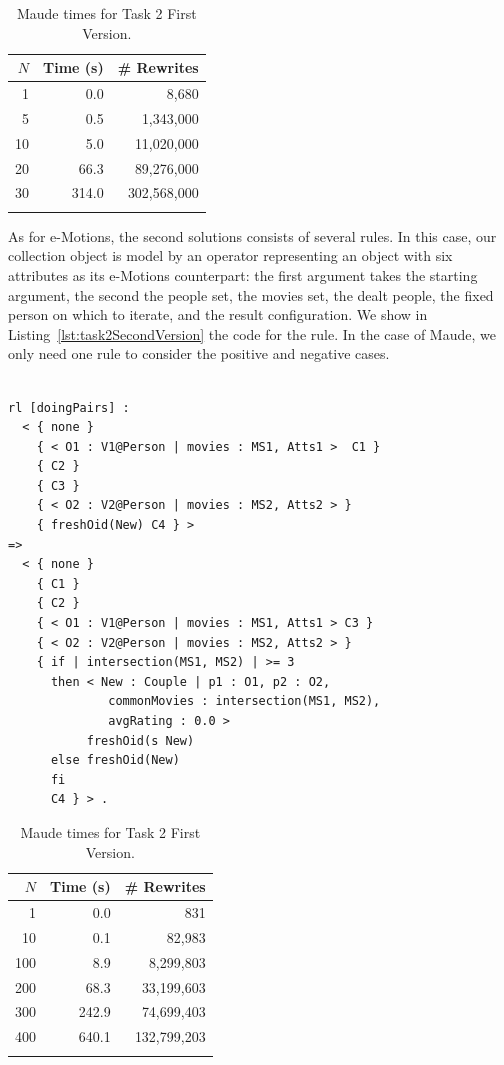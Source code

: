 \begin{table}[htb]
\renewcommand{\tabcolsep}{6pt}
\renewcommand{\arraystretch}{1.2}
    \centering
	\begin{tabular}{r r r}
	$N$ & Time (s) & \# Rewrites \\
	\hline
	1 & 0.0 & 8,680 \\
	5 & 0.5 & 1,343,000 \\
	10 & 5.0 & 11,020,000 \\
	20 & 66.3 & 89,276,000 \\
	30 & 314.0 & 302,568,000 \\
	\hline \\
	\end{tabular}
	\caption{Maude times for Task 2 First Version.}\label{table:maudetask21}
\end{table}

As for e-Motions, the second solutions consists of several rules. In this case, our collection object is model by an operator \code{\{\_\}\{\_\}\{\_\}\{\_\}\{\_\}\{\_\}} representing an object with six attributes as its e-Motions counterpart: the first argument takes the starting argument, the second the people set, the movies set, the dealt people, the fixed person on which to iterate, and the result configuration. We show in Listing~\ref{lst:task2SecondVersion} the code for the  rule. In the case of Maude, we only need one rule to consider the positive and negative cases. 

\begin{lstlisting}[caption=\code{doingCouples} Maude rule., label=lst:task2SecondVersion]

rl [doingPairs] :
  < { none }
    { < O1 : V1@Person | movies : MS1, Atts1 >  C1 }
    { C2 }
    { C3 }
    { < O2 : V2@Person | movies : MS2, Atts2 > }
    { freshOid(New) C4 } >
=> 
  < { none }
    { C1 }
    { C2 }
    { < O1 : V1@Person | movies : MS1, Atts1 > C3 }
    { < O2 : V2@Person | movies : MS2, Atts2 > }
    { if | intersection(MS1, MS2) | >= 3 
      then < New : Couple | p1 : O1, p2 : O2, 
              commonMovies : intersection(MS1, MS2), 
              avgRating : 0.0 >
           freshOid(s New)
      else freshOid(New)
      fi 
      C4 } > .
\end{lstlisting}

\begin{table}[htb]
\renewcommand{\tabcolsep}{6pt}
\renewcommand{\arraystretch}{1.2}
    \centering
	\begin{tabular}{r r r}
	$N$ & Time (s) & \# Rewrites \\
	\hline
	1 & 0.0 & 831 \\
	10 & 0.1 & 82,983 \\
	100 & 8.9 & 8,299,803 \\
	200 & 68.3 & 33,199,603 \\
	300 & 242.9 & 74,699,403 \\
	400 & 640.1 & 132,799,203 \\
	\hline \\
	\end{tabular}
	\caption{Maude times for Task 2 First Version.}\label{table:maudetask21}
\end{table}
